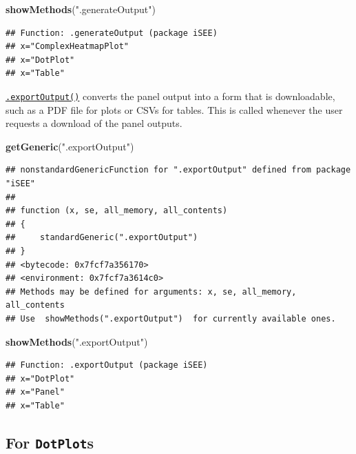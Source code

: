 \documentclass[
]{book}
\newenvironment{Shaded}{\begin{snugshade}}{\end{snugshade}}
\newcommand{\KeywordTok}[1]{\textcolor[rgb]{0.13,0.29,0.53}{\textbf{#1}}}
\newcommand{\NormalTok}[1]{#1}
\newcommand{\StringTok}[1]{\textcolor[rgb]{0.31,0.60,0.02}{#1}}
\begin{document}
\begin{Shaded}
\begin{Highlighting}[]
\KeywordTok{showMethods}\NormalTok{(}\StringTok{".generateOutput"}\NormalTok{)}
\end{Highlighting}
\end{Shaded}

\begin{verbatim}
## Function: .generateOutput (package iSEE)
## x="ComplexHeatmapPlot"
## x="DotPlot"
## x="Table"
\end{verbatim}

\href{https://isee.github.io/iSEE/reference/output-generics.html}{\texttt{.exportOutput()}} converts the panel output into a form that is downloadable, such as a PDF file for plots or CSVs for tables.
This is called whenever the user requests a download of the panel outputs.

\begin{Shaded}
\begin{Highlighting}[]
\KeywordTok{getGeneric}\NormalTok{(}\StringTok{".exportOutput"}\NormalTok{)}
\end{Highlighting}
\end{Shaded}

\begin{verbatim}
## nonstandardGenericFunction for ".exportOutput" defined from package "iSEE"
## 
## function (x, se, all_memory, all_contents) 
## {
##     standardGeneric(".exportOutput")
## }
## <bytecode: 0x7fcf7a356170>
## <environment: 0x7fcf7a3614c0>
## Methods may be defined for arguments: x, se, all_memory, all_contents
## Use  showMethods(".exportOutput")  for currently available ones.
\end{verbatim}

\begin{Shaded}
\begin{Highlighting}[]
\KeywordTok{showMethods}\NormalTok{(}\StringTok{".exportOutput"}\NormalTok{)}
\end{Highlighting}
\end{Shaded}

\begin{verbatim}
## Function: .exportOutput (package iSEE)
## x="DotPlot"
## x="Panel"
## x="Table"
\end{verbatim}

\hypertarget{for-dotplots}{%
\subsection{\texorpdfstring{For \texttt{DotPlot}s}{For DotPlots}}\label{for-dotplots}}
\end{document}
